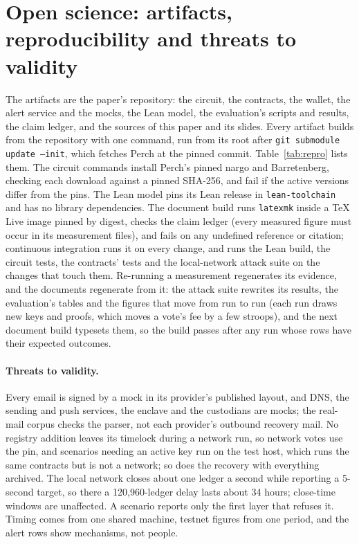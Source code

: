 \section{Open science: artifacts, reproducibility and threats to validity}\label{app:repro}

The artifacts are the paper's repository: the circuit, the contracts, the
wallet, the alert service and the mocks, the Lean model, the evaluation's
scripts and results, the claim ledger, and the sources of this paper and its
slides. Every artifact builds from the repository with one command, run from its
root after \texttt{git submodule update --init}, which fetches Perch at the
pinned commit. Table~\ref{tab:repro} lists them. The circuit commands install
Perch's pinned nargo and Barretenberg, checking each download against a
pinned SHA-256, and fail if the active versions differ from the pins. The
Lean model pins its Lean release in \texttt{lean-toolchain} and has no
library dependencies. The document build runs \texttt{latexmk} inside a TeX
Live image pinned by digest, checks the claim ledger (every measured figure
must occur in its measurement files), and fails on any undefined reference
or citation; continuous integration runs it on every
change, and runs the Lean build, the circuit tests, the contracts' tests and
the local-network attack suite on the changes that touch them. Re-running a
measurement regenerates its evidence, and the documents regenerate from it:
the attack suite rewrites its results, the evaluation's tables and the
figures that move from run to run (each run draws new keys and proofs, which
moves a vote's fee by a few stroops), and the next document build typesets
them, so the build passes after any run whose rows have their expected
outcomes.

\paragraph{Threats to validity.}\label{sec:eval-threats}
Every email is signed by a mock in its provider's published layout, and DNS,
the sending and push services, the enclave and the custodians are mocks; the
real-mail corpus checks the parser, not each provider's outbound recovery
mail. No registry addition leaves its timelock during a network run, so
network votes use the pin, and scenarios needing an active key run on the
test host, which runs the same contracts but is not a network; so does the
recovery with everything archived. The local network closes about one ledger
a second while reporting a 5-second target, so there a 120{,}960-ledger delay
lasts about 34 hours; close-time windows are unaffected. A scenario reports
only the first layer that refuses it. Timing comes from one shared machine,
testnet figures from one period, and the alert rows show mechanisms, not
people.

